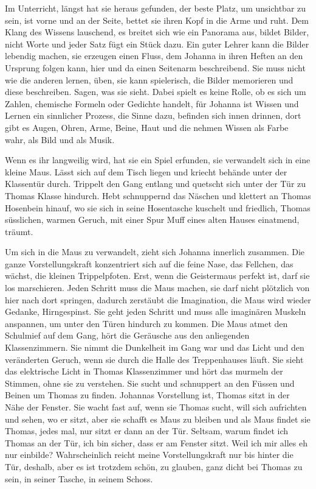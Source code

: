 \documentclass[10pt,titlepage,a5paper]{book}
\begin{document}
Im Unterricht, längst hat sie heraus gefunden, der beste Platz, um unsichtbar zu sein, ist vorne und an der Seite, bettet sie ihren Kopf in die Arme und ruht. Dem Klang des Wissens lauschend, es breitet sich wie ein Panorama aus, bildet Bilder, nicht Worte und jeder Satz fügt ein Stück dazu. Ein guter Lehrer kann die Bilder lebendig machen, sie erzeugen einen Fluss, dem Johanna in ihren Heften an den Ursprung folgen kann, hier und da einen Seitenarm beschreibend. Sie muss nicht wie die anderen lernen, üben, sie kann spielerisch, die Bilder memorieren und diese beschreiben. Sagen, was sie sieht. Dabei spielt es keine Rolle, ob es sich um Zahlen, chemische Formeln oder Gedichte handelt, für Johanna ist Wissen und Lernen ein sinnlicher Prozess, die Sinne dazu, befinden sich innen drinnen, dort gibt es Augen, Ohren, Arme, Beine, Haut und die nehmen Wissen als Farbe wahr, als Bild  und als Musik.

Wenn es ihr langweilig wird, hat sie ein Spiel erfunden, sie verwandelt sich in eine kleine Maus. Lässt sich auf dem Tisch liegen und kriecht behände unter der Klassentür durch. Trippelt den Gang entlang und quetscht sich unter der Tür zu Thomas Klasse hindurch. Hebt schnuppernd das Näschen und klettert an Thomas Hosenbein hinauf, wo sie sich in seine Hosentasche kuschelt und friedlich, Thomas süsslichen, warmen Geruch, mit einer Spur Muff eines alten Hauses einatmend, träumt. 

Um sich in die Maus zu verwandelt, zieht sich Johanna innerlich zusammen. Die ganze Vorstellungskraft konzentriert sich auf die feine Nase, das Fellchen, das wächst, die kleinen Trippelpfoten. Erst, wenn die Geistermaus perfekt ist, darf sie los marschieren. Jeden Schritt muss die Maus machen, sie darf nicht plötzlich von hier nach dort springen, dadurch zerstäubt die Imagination, die Maus wird wieder Gedanke, Hirngespinst. Sie geht jeden Schritt und muss alle imaginären Muskeln anspannen, um unter den Türen hindurch zu kommen. Die Maus atmet den Schulmief auf dem Gang, hört die Geräusche aus den anliegenden Klassenzimmern. Sie nimmt die Dunkelheit im Gang war und das Licht und den veränderten Geruch, wenn sie durch die Halle des Treppenhauses läuft. Sie sieht das elektrische Licht in Thomas Klassenzimmer und hört das murmeln der Stimmen, ohne sie zu verstehen. Sie sucht und schnuppert an den Füssen und Beinen um Thomas zu finden. Johannas Vorstellung ist, Thomas sitzt in der Nähe der Fenster. Sie wacht fast auf, wenn sie Thomas sucht, will sich aufrichten und sehen, wo er sitzt, aber sie schafft es Maus zu bleiben und als Maus findet sie Thomas, jedes mal, nur sitzt er dann an der Tür. Seltsam, warum findet ich Thomas an der Tür, ich bin sicher, dass er am Fenster sitzt. Weil ich mir alles eh nur einbilde? Wahrscheinlich reicht meine Vorstellungskraft nur bis hinter die Tür, deshalb, aber es ist trotzdem schön, zu glauben, ganz dicht bei Thomas zu sein, in seiner Tasche, in seinem Schoss.
\end{document}
